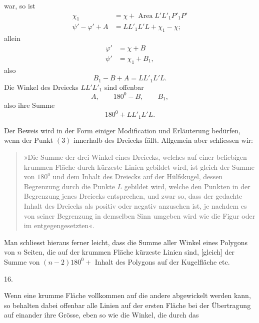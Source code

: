 %
war, so ist
\[
\begin{aligned}
\chi_1&=\chi+\operatorname{Area}L'L'_1P'_1P'\\
\psi'-\varphi'+A&=LL'_1L'L+\chi_1-\chi;
\end{aligned}
\]
allein
\[
\begin{aligned}
\varphi'&=\chi+B\\
\psi'&=\chi_1+B_1,
\end{aligned}
\]
also
\[
B_1-B+A=LL'_1L'L.
\]
Die Winkel des Dreiecks $LL'L'_1$ sind offenbar
\[
A,\qquad 180^{0}-B,\qquad B_1,
\]
also ihre Summe
\[
180^{0}+LL'_1L'L.
\]

Der Beweis wird in der Form einiger Modification und Erläuterung bedürfen, wenn der Punkt $(3)$ innerhalb des Dreiecks fällt. Allgemein aber schliessen wir:
\begin{quote}
»Die Summe der drei Winkel eines Dreiecks, welches auf einer beliebigen krummen Fläche durch kürzeste Linien gebildet wird, ist gleich der Summe von $180^{0}$ und dem Inhalt des Dreiecks auf der Hülfskugel, dessen Begrenzung durch die Punkte $L$ gebildet wird, welche den Punkten in der Begrenzung jenes Dreiecks entsprechen, und zwar so, dass der gedachte Inhalt des Dreiecks als positiv oder negativ anzusehen ist, je nachdem es von seiner Begrenzung in demselben Sinn umgeben wird wie die Figur oder im entgegengesetzten«.
\end{quote}
\noindent\hspace*{1.2em}Man schliesst hieraus ferner leicht, dass die Summe aller Winkel eines Polygons von $n$ Seiten, die auf der krummen Fläche kürzeste Linien sind, [gleich] der Summe von $(n-2)180^{0}+$ Inhalt des Polygons auf der Kugelfläche etc.

\begin{center}16.\end{center}
\noindent\hspace*{1.2em}Wenn eine krumme Fläche vollkommen auf die andere abgewickelt werden kann, so behalten dabei offenbar alle Linien auf der ersten Fläche bei der Übertragung auf einander ihre Grösse, eben so wie die Winkel, die durch das
